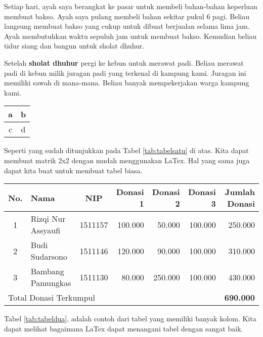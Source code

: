 \documentclass[12pt, Liberation Sans]{article}
\begin{document}
Setiap hari, ayah saya berangkat ke pasar untuk membeli bahan-bahan keperluan membuat bakso. Ayah saya pulang membeli bahan sekitar pukul 6 pagi. Beliau langsung membuat bakso yang cukup untuk dibuat berjualan selama lima jam. Ayah membutuhkan waktu sepuluh jam untuk membuat bakso. Kemudian beliau tidur siang dan bangun untuk sholat dhuhur.

Setelah \textbf{sholat dhuhur} pergi ke kebun untuk merawat padi. Beliau merawat padi di kebun milik juragan padi yang terkenal di kampung kami. Juragan ini memiliki sawah di mana-mana. Beliau banyak mempekerjakan warga kampung kami.\\

\begin{center}
  \begin{minipage}{\textwidth}
    \label{tab:tabelsatu}
    \begin{center}
      \begin{tabular}{|c|c|}
        \hline
        a & b\\
        \hline
        c & d\\
        \hline
      \end{tabular}
    \end{center}
  \end{minipage}
  \newline
\end{center}

Seperti yang sudah ditunjukkan pada Tabel \ref{tab:tabelsatu} di atas. Kita dapat membuat matrik 2x2 dengan mudah menggunakan LaTex. Hal yang sama juga dapat kita buat untuk membuat tabel biasa.\\

\begin{center}
  \begin{minipage}{\textwidth}
    \label{tab:tabeldua}
    \begin{tabular}{|c|l|c|r|r|r|r|}
      \hline
      No. & Nama & NIP & Donasi 1 & Donasi 2 & Donasi 3 & Jumlah Donasi\\
      \hline
      1 & Rizqi Nur Assyaufi & 1511157 & 100.000 & 50.000 & 100.000 & 250.000\\
      \hline
      2 & Budi Sudarsono & 1511146 & 120.000 & 90.000 & 100.000 & 310.000\\
      \hline
      3 & Bambang Pamungkas & 1511130 & 80.000 & 250.000 & 100.000 & 430.000\\
      \hline
      \multicolumn{6}{|l|}{Total Donasi Terkumpul} & \textbf{690.000}\\
      \hline
    \end{tabular}
  \end{minipage}
  \newline
\end{center}

Tabel \ref{tab:tabeldua}, adalah contoh dari tabel yang memiliki banyak kolom.  Kita dapat melihat bagaimana LaTex dapat menangani tabel dengan sangat baik.
\end{document}

